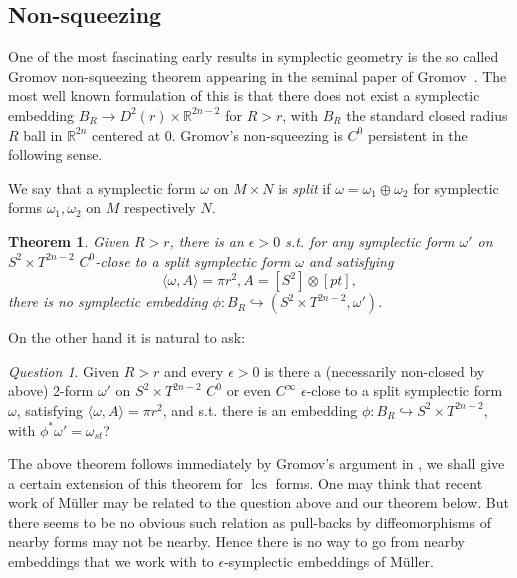\documentclass{amsart}
\numberwithin{equation}{section}
\newtheorem{theorem}[equation]{Theorem}
\theoremstyle{definition}
\theoremstyle{remark}
\newtheorem{question}{Question}
\DeclareMathOperator{\lcs}{lcs}
\begin{document}
\subsection {Non-squeezing}
One of the most fascinating early results in symplectic geometry is the so called Gromov non-squeezing theorem appearing in the seminal paper of Gromov~\cite{citeGromovPseudoholomorphiccurvesinsymplecticmanifolds.}.
The most well known formulation of this is that there does not exist a  symplectic embedding $B _{R} \to D ^{2} (r)  \times \mathbb{R} ^{2n-2}   $ for $R>r$, with $ B _{R}  $ the standard closed radius $R$ ball 
in $\mathbb{R} ^{2n} $ centered at $0$.
Gromov's non-squeezing is $C ^{0} $ persistent in the following sense. 

We say that a symplectic form $\omega$ on $M \times N$ is \emph{split} if $\omega= \omega _{1} \oplus \omega _{2} $ for symplectic forms $\omega _{1}, \omega _{2}  $ on $M$ respectively $N$.
\begin{theorem} \label{thm:Gromov} Given $R>r$, there is an $\epsilon>0$ s.t. for any symplectic form $\omega' $ on $S ^{2} \times T ^{2n-2}  $ $C ^{0} $-close to a split symplectic form $\omega $ and satisfying $$ \langle \omega, A  \rangle = \pi r ^{2}, A=[S ^{2} ] \otimes [pt],  $$  there is no symplectic embedding $\phi: B _{R} \hookrightarrow (S ^{2} \times T ^{2n-2}, \omega')   $.
\end{theorem}
 On the other hand it is natural to ask: 
\begin{question} \label{thm:nonrigidity} Given $R>r$ and every $\epsilon > 0 $ is there
a (necessarily non-closed by above) 2-form $\omega'$ on $S ^{2} \times T ^{2n-2}  $  $C ^{0} $ or even $C ^{\infty} $ $\epsilon$-close to a split symplectic form $\omega $, satisfying $ \langle \omega, A  \rangle = \pi r ^{2}  $, and s.t. there is an embedding $\phi: B _{R} \hookrightarrow S ^{2} \times T ^{2n-2}   $, with $\phi ^{*}\omega'=\omega _{st}  $?
\end{question}
The above theorem follows immediately by Gromov's argument in \cite{citeGromovPseudoholomorphiccurvesinsymplecticmanifolds.}, we shall give a certain extension of this theorem for $\lcs$ forms.
One may think that recent work of M\"uller \cite{citeMuller} may be related to the question above and our theorem below. But there seems to be no obvious such relation as pull-backs by diffeomorphisms of nearby forms may not be nearby. Hence there is no way to go from nearby embeddings that we work with to $\epsilon$-symplectic embeddings of M\"uller.
\end{document}
